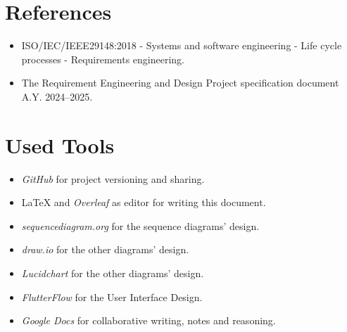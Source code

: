 \section{References}
\label{sec:references}%

\begin{itemize}
    \item ISO/IEC/IEEE29148:2018 - Systems and software engineering - Life cycle processes - Requirements engineering.
    \item The Requirement Engineering and Design Project specification document A.Y. 2024–2025. 
\end{itemize}

\section{Used Tools}
\label{sec:used_tools}%
\begin{itemize}
    \item \textit{GitHub} for project versioning and sharing.
    \item \LaTeX{} and \textit{Overleaf} as editor for writing this document.
    \item \textit{sequencediagram.org} for the sequence diagrams' design.
    \item \textit{draw.io} for the other diagrams' design.
    \item \textit{Lucidchart} for the other diagrams' design.
    \item \textit{FlutterFlow} for the User Interface Design.
    \item \textit{Google Docs} for collaborative writing, notes and reasoning.
\end{itemize}
